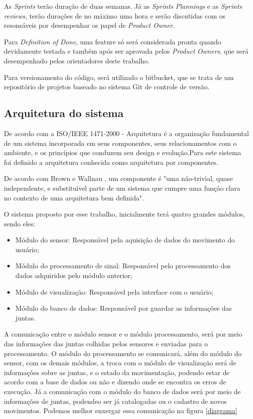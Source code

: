   As \textit{Sprints} terão duração de duas semanas. Já as \textit{Sprints Plannings}
e as \textit{Sprints reviews}, terão durações de no máximo uma hora e serão 
discutidas com os resonsáveis por desempenhar os papel de \textit{Product Owner}.

  Para \textit{Definition of Done}, uma feature só será considerada pronta quando
devidamente testada e também após ser aprovada pelos \textit{Product Owners}, que 
será desempenhado pelos orientadores deste trabalho.
  
  Para versionamento do código, será utilizado o bitbucket, que se trata de um
repositório de projetos baseado no sistema Git de controle de versão.

\subsection{Arquitetura do sistema}
\label{Sec:arquitetura}
  De acordo com a ISO/IEEE 1471-2000 - Arquitetura é a organização fundamental 
de um sistema incorporada em seus componentes, seus relacionamentos com o 
ambiente, e os princípios que conduzem seu design e evolução.Para este sistema 
foi definido a arquitetura conhecida como arquitetura por componentes.
  
  De acordo com Brown e Wallnau \cite{brownWall}, um componente é 
"uma não-trivial, quase independente, e substituível parte de um sistema que 
cumpre uma função clara no contexto de uma arquitetura bem definida".

  O sistema proposto por esse trabalho, inicialmente terá quatro grandes módulos,
 sendo eles:

  \begin{itemize}
  \item Módulo do sensor: Responsável pela aquisição de dados do movimento do 
  usuário;
  \item Módulo do processamento de sinal: Responsável pelo processamento dos dados
  adquiridos pelo módulo anterior;
  \item Módulo de visualização: Responsável pela interface com o usuário;
  \item Módulo do banco de dados: Responsável por guardar as informações das juntas.
  \end{itemize} 

  A comunicação entre o módulo sensor e o módulo processamento, será por meio 
das informações das juntas colhidas pelos sensores e enviadas para o processamento.
O módulo do processamento se comunicará, além do módulo do sensor, com os demais
módulos, a troca com o módulo de visualização será de  informações sobre as juntas,
e o estado da movimentação, podendo estar de acordo com a base de dados ou não e 
dizendo onde se encontra os erros de execução. Já a comunicação com o módulo do
banco de dados será por meio de informações de juntas, podendeo ser já catalogadas
 ou o cadastro de novos movimentos. Podemos melhor enxergar essa comunicação na 
figura \ref{diagrama}

